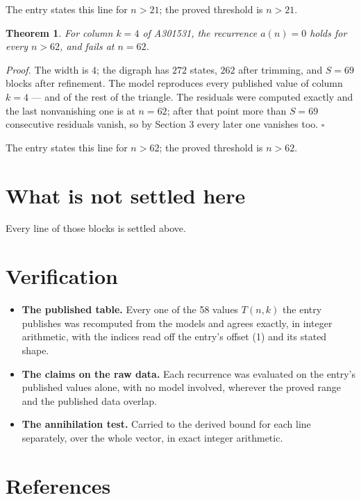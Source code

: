 \documentclass[11pt]{article}
\newtheorem{theorem}{Theorem}
\theoremstyle{definition}
\begin{document}
The entry states this line for $n > 21$; the proved threshold is $n > 21$.

\begin{theorem} For column $k = 4$ of A301531, the recurrence $a(n) = 0$ holds for every $n > 62$, and fails at $n = 62$.\end{theorem}

{\itshape Proof.} The width is $4$; the digraph has $272$ states, $262$ after trimming, and $S = 69$ blocks after refinement. The model reproduces every published value of column $k = 4$ --- and of the rest of the triangle. The residuals were computed exactly and the last nonvanishing one is at $n = 62$; after that point more than $S = 69$ consecutive residuals vanish, so by Section 3 every later one vanishes too. $\square$

The entry states this line for $n > 62$; the proved threshold is $n > 62$.

\section{What is not settled here}

Every line of those blocks is settled above.

\section{Verification}

\begin{itemize}

\item {\bfseries The published table.} Every one of the 58 values $T(n,k)$ the entry publishes was recomputed from the models and agrees exactly, in integer arithmetic, with the indices read off the entry's offset (1) and its stated shape.

\item {\bfseries The claims on the raw data.} Each recurrence was evaluated on the entry's published values alone, with no model involved, wherever the proved range and the published data overlap.

\item {\bfseries The annihilation test.} Carried to the derived bound for each line separately, over the whole vector, in exact integer arithmetic.

\end{itemize}

\section{References}
\end{document}
